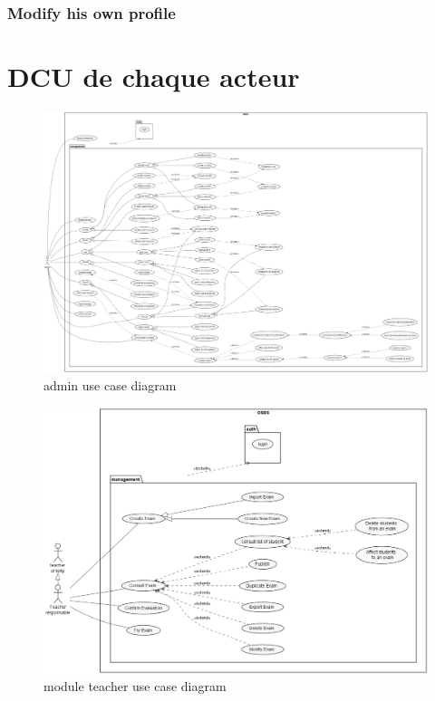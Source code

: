 \documentclass[a4paper,12p]{article}
\begin{document}
     \subsubsection{Modify his own profile}


     \section{DCU de chaque acteur}


    \begin{figure}[h]
        \centering
        \includegraphics[width=\textwidth]{admin_UCD}
        \caption{admin use case diagram}
    \end{figure}

    \begin{figure}[h]
        \centering
        \includegraphics[width=\textwidth]{Module_Teacher}
        \caption{module teacher use case diagram}
    \end{figure}
\end{document}
